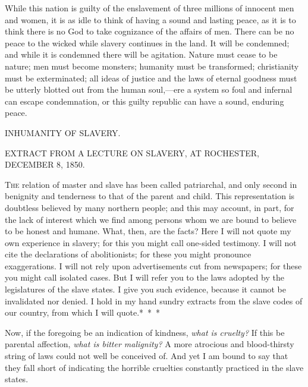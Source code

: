 While this nation is guilty of the enslavement of three millions of
innocent men and women, it is as idle to think of having a sound and
lasting peace, as it is to think there is no God to take cognizance of
the affairs of men. There can be no peace to the wicked while slavery
continues in the land. It will be condemned; and while it is condemned
there will be agitation. Nature must cease to be nature; men must become
monsters; humanity must be transformed; christianity must be
exterminated; all ideas of justice and the laws of eternal goodness must
be utterly blotted out from the human soul,---ere a system so foul and
infernal can escape condemnation, or this guilty republic can have a
sound, enduring peace.

{\protect\hypertarget{ux5cux7bux5cux7bux5cux7b1ux5cux7dux5cux7dux5cux7d}{}{}}

{}

{INHUMANITY OF SLAVERY.}

{EXTRACT FROM A LECTURE ON SLAVERY, AT ROCHESTER, DECEMBER 8, 1850.}

\textsc{The} relation of master and slave has been called patriarchal,
and only second in benignity and tenderness to that of the parent and
child. This representation is doubtless believed by many northern
people; and this may account, in part, for the lack of interest which we
find among persons whom we are bound to believe to be honest and humane.
What, then, are the facts? Here I will not quote my own experience in
slavery; for this you might call one-sided testimony. I will not cite
the declarations of abolitionists; for these you might pronounce
exaggerations. I will not rely upon advertisements cut from newspapers;
for these you might call isolated cases. But I will refer you to the
laws adopted by the legislatures of the slave states. I give you such
evidence, because it cannot be invalidated nor denied. I hold in my hand
sundry extracts from the slave codes of our country, from which I will
quote.{*~*~*}

Now, if the foregoing be an indication of kindness, \emph{what is
cruelty?} If this be parental affection, \emph{what is bitter
malignity?} A more atrocious and blood-thirsty string of laws could not
well be conceived of. And yet I am bound to say that they fall short of
indicating the horrible cruelties constantly practiced in the slave
states.

